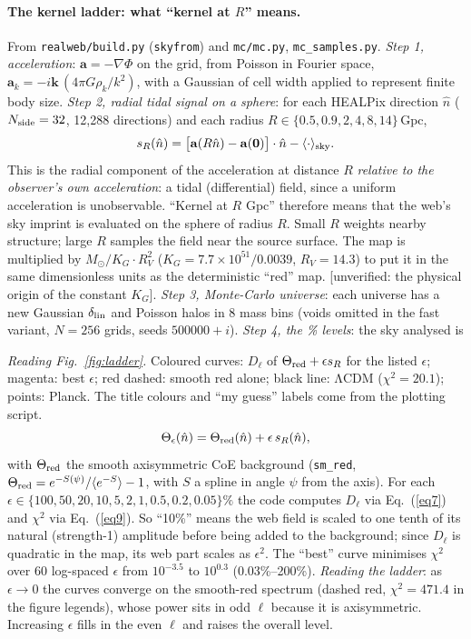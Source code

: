 \documentclass[10pt,twocolumn]{article}
\newcommand{\flag}[1]{\textsf{[unverified: #1]}}
\begin{document}
\paragraph{The kernel ladder: what ``kernel at $R$'' means.} From \texttt{realweb/build.py} (\texttt{skyfrom}) and \texttt{mc/mc.py}, \texttt{mc\_samples.py}. \emph{Step 1, acceleration}: $\mathbf a=-\nabla\Phi$ on the grid, from Poisson in Fourier space, $\mathbf a_k=-i\mathbf k\,(4\pi G\rho_k/k^2)$, with a Gaussian of cell width applied to represent finite body size. \emph{Step 2, radial tidal signal on a sphere}: for each HEALPix direction $\hat n$ ($N_{\rm side}=32$, 12{,}288 directions) and each radius $R\in\{0.5,0.9,2,4,8,14\}$\,Gpc,
\begin{equation}\label{eq13}
s_R(\hat n)=\big[\mathbf a(R\hat n)-\mathbf a(\mathbf 0)\big]\cdot\hat n-\langle\cdot\rangle_{\rm sky}.
\end{equation}
This is the radial component of the acceleration at distance $R$ \emph{relative to the observer's own acceleration}: a tidal (differential) field, since a uniform acceleration is unobservable. ``Kernel at $R$ Gpc'' therefore means that the web's sky imprint is evaluated on the sphere of radius $R$. Small $R$ weights nearby structure; large $R$ samples the field near the source surface. The map is multiplied by $M_\odot/K_G\cdot R_V^2$ ($K_G=7.7\times10^{51}/0.0039$, $R_V=14.3$) to put it in the same dimensionless units as the deterministic ``red'' map. \flag{the physical origin of the constant $K_G$}. \emph{Step 3, Monte-Carlo universe}: each universe has a new Gaussian $\delta_{\rm lin}$ and Poisson halos in 8 mass bins (voids omitted in the fast variant, $N=256$ grids, seeds $500000+i$). \emph{Step 4, the \% levels}: the sky analysed is


\noindent\emph{Reading Fig.~\ref{fig:ladder}.} Coloured curves: $D_\ell$ of $\Theta_{\rm red}+\epsilon s_R$ for the listed $\epsilon$; magenta: best $\epsilon$; red dashed: smooth red alone; black line: ΛCDM ($\chi^2=20.1$); points: Planck. The title colours and ``my guess'' labels come from the plotting script.
\begin{equation}\label{eq14}
\Theta_\epsilon(\hat n)=\Theta_{\rm red}(\hat n)+\epsilon\,s_R(\hat n),
\end{equation}
with $\Theta_{\rm red}$ the smooth axisymmetric CoE background (\texttt{sm\_red}, $\Theta_{\rm red}=e^{-S(\psi)}/\langle e^{-S}\rangle-1$, with $S$ a spline in angle $\psi$ from the axis). For each $\epsilon\in\{100,50,20,10,5,2,1,0.5,0.2,0.05\}\%$ the code computes $D_\ell$ via Eq.~(\ref{eq7}) and $\chi^2$ via Eq.~(\ref{eq9}). So ``10\%'' means the web field is scaled to one tenth of its natural (strength-1) amplitude before being added to the background; since $D_\ell$ is quadratic in the map, its web part scales as $\epsilon^2$. The ``best'' curve minimises $\chi^2$ over 60 log-spaced $\epsilon$ from $10^{-3.5}$ to $10^{0.3}$ (0.03\%--200\%). \emph{Reading the ladder}: as $\epsilon\to0$ the curves converge on the smooth-red spectrum (dashed red, $\chi^2=471.4$ in the figure legends), whose power sits in odd $\ell$ because it is axisymmetric. Increasing $\epsilon$ fills in the even $\ell$ and raises the overall level.
\end{document}
